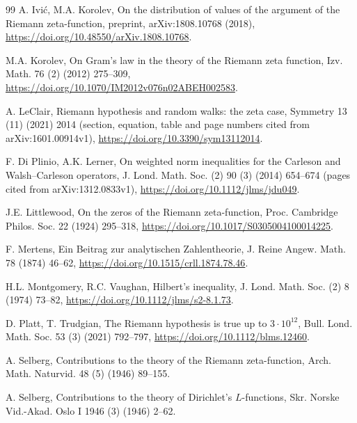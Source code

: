 \documentclass[preprint,12pt]{elsarticle}
\numberwithin{equation}{section}
\theoremstyle{plain}
\theoremstyle{definition}
\theoremstyle{remark}
\begin{document}
\begin{thebibliography}{99}
A. Ivi\'c, M.A. Korolev, On the distribution of values of the argument of the Riemann zeta-function, preprint, arXiv:1808.10768 (2018), \href{https://doi.org/10.48550/arXiv.1808.10768}{https://doi.org/10.48550/arXiv.1808.10768}.

M.A. Korolev, On Gram's law in the theory of the Riemann zeta function, Izv. Math. 76 (2) (2012) 275--309, \href{https://doi.org/10.1070/IM2012v076n02ABEH002583}{https://doi.org/10.1070/IM2012v076n02ABEH002583}.


A. LeClair, Riemann hypothesis and random walks: the zeta case, Symmetry 13 (11) (2021) 2014 (section, equation, table and page numbers cited from arXiv:1601.00914v1), \href{https://doi.org/10.3390/sym13112014}{https://doi.org/10.3390/sym13112014}.

F. Di Plinio, A.K. Lerner, On weighted norm inequalities for the Carleson and Walsh--Carleson operators, J. Lond. Math. Soc. (2) 90 (3) (2014) 654--674 (pages cited from arXiv:1312.0833v1), \href{https://doi.org/10.1112/jlms/jdu049}{https://doi.org/10.1112/jlms/jdu049}.

J.E. Littlewood, On the zeros of the Riemann zeta-function, Proc. Cambridge Philos. Soc. 22 (1924) 295--318, \href{https://doi.org/10.1017/S0305004100014225}{https://doi.org/10.1017/S0305004100014225}.

F. Mertens, Ein Beitrag zur analytischen Zahlentheorie, J. Reine Angew. Math. 78 (1874) 46--62, \href{https://doi.org/10.1515/crll.1874.78.46}{https://doi.org/10.1515/crll.1874.78.46}.

H.L. Montgomery, R.C. Vaughan, Hilbert's inequality, J. Lond. Math. Soc. (2) 8 (1974) 73--82, \href{https://doi.org/10.1112/jlms/s2-8.1.73}{https://doi.org/10.1112/jlms/s2-8.1.73}.

D. Platt, T. Trudgian, The Riemann hypothesis is true up to $3\cdot10^{12}$, Bull. Lond. Math. Soc. 53 (3) (2021) 792--797, \href{https://doi.org/10.1112/blms.12460}{https://doi.org/10.1112/blms.12460}.

A. Selberg, Contributions to the theory of the Riemann zeta-function, Arch. Math. Naturvid. 48 (5) (1946) 89--155.

A. Selberg, Contributions to the theory of Dirichlet's $L$-functions, Skr. Norske Vid.-Akad. Oslo I 1946 (3) (1946) 2--62.


\end{thebibliography}
\end{document}
